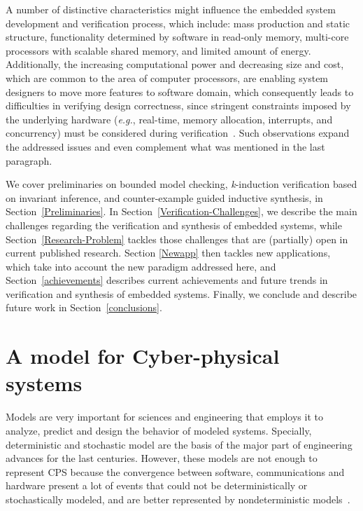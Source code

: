 \documentclass{acm_sen_article}
\begin{document}
A number of distinctive characteristics might influence the embedded system development and verification process, which include: mass production and static structure, functionality determined by software in read-only memory, multi-core processors with scalable shared memory, and limited amount of energy. Additionally, the increasing computational power and decreasing size and cost, which are common to the area of computer processors, are enabling system designers to move more features to software domain, which consequently leads to difficulties in verifying design correctness, since stringent constraints imposed by the underlying hardware ({\it e.g.}, real-time, memory allocation, interrupts, and concurrency) must be considered during verification~\cite{Kroening15}. Such observations expand the addressed issues and even complement what was mentioned in the last paragraph.

We cover preliminaries on bounded model checking, \textit{k}-induction verification based on invariant inference, and counter-example guided inductive synthesis, in Section~\ref{Preliminaries}. In Section~\ref{Verification-Challenges}, we describe the main challenges regarding the verification and synthesis of embedded systems, while Section~\ref{Research-Problem} tackles those challenges that are (partially) open in current published research. Section \ref{Newapp} then tackles new applications, which take into account the new paradigm addressed here, and Section~\ref{achievements} describes current achievements and future trends in verification and synthesis of embedded systems. Finally, we conclude and describe future work in Section~\ref{conclusions}.

\section{A model for Cyber-physical systems}
\label{sec:model}

Models are very important for sciences and engineering that employs it to analyze, predict and design the behavior of modeled systems. Specially, deterministic and stochastic model are the basis of the major part of engineering advances for the last centuries. However, these models are not enough to represent CPS because the convergence between software, communications and hardware present a lot of events that could not be deterministically or stochastically modeled, and are better represented by nondeterministic models~\cite{leeCPS15}.
\end{document}
